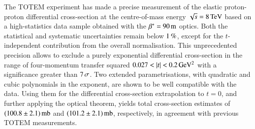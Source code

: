 The TOTEM experiment has made a precise measurement of the elastic 
proton-proton differential cross-section at the centre-of-mass energy 
$\sqrt s = 8\,{\rm TeV}$ based on a high-statistics data sample obtained with 
the $\beta^* = 90\,{\rm m}$ optics. 
Both the statistical and systematic uncertainties remain below $1\,{\rm \%}$, except for the $t$-independent contribution from the overall normalisation. This unprecedented precision allows to exclude a purely exponential differential cross-section in the range of four-momentum transfer squared $0.027 < |t| < 0.2\,{\rm GeV^2}$ with a significance greater than $7\,{\rm \sigma}$. Two extended parametrisations, with quadratic and cubic polynomials in the exponent, are shown to be well compatible with the data. Using them for the differential cross-section extrapolation to $t=0$, and further applying the optical theorem, yields total cross-section estimates of $(100.8 \pm 2.1)\,{\rm mb}$ and $(101.2 \pm 2.1)\,{\rm mb}$, respectively, in agreement with previous TOTEM measurements.
